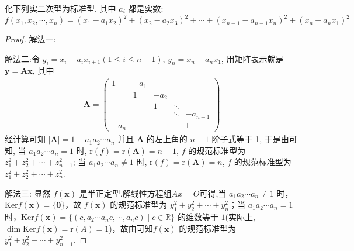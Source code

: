 \documentclass[../../main.tex]{subfiles}%
\begin{document}
\begin{example}\label{example:例8.35}
化下列实二次型为标准型, 其中 \(a_i\) 都是实数:
\[f(x_1,x_2,\cdots,x_n)=(x_1 - a_1x_2)^2+(x_2 - a_2x_3)^2+\cdots+(x_{n - 1} - a_{n - 1}x_n)^2+(x_n - a_nx_1)^2\]
\end{example}
\begin{proof}

{\color{blue}解法一:}

{\color{blue}解法二:}令 \(y_i = x_i - a_ix_{i + 1}(1\leqslant  i\leqslant  n - 1)\), \(y_n = x_n - a_nx_1\), 用矩阵表示就是 \(\boldsymbol{y} = \boldsymbol{A}\boldsymbol{x}\), 其中
\begin{align*}
\boldsymbol{A} = \begin{pmatrix}
1 & -a_1 & & & \\
& 1 & -a_2 & & \\
& & 1 & \ddots & \\
& & & \ddots & -a_{n - 1} \\
-a_n & & & & 1
\end{pmatrix}
\end{align*}
经计算可知 \(|\boldsymbol{A}| = 1 - a_1a_2\cdots a_n\) 并且 \(\boldsymbol{A}\) 的左上角的 \(n - 1\) 阶子式等于 1, 于是由可知, 当 \(a_1a_2\cdots a_n = 1\) 时, \(\mathrm{r}(f)=\mathrm{r}(\boldsymbol{A}) = n - 1\), \(f\) 的规范标准型为 \(z_1^2 + z_2^2 + \cdots + z_{n - 1}^2\); 当 \(a_1a_2\cdots a_n\neq1\) 时, \(\mathrm{r}(f)=\mathrm{r}(\boldsymbol{A}) = n\), \(f\) 的规范标准型为 \(z_1^2 + z_2^2 + \cdots + z_n^2\).

{\color{blue}解法三:}
显然 $f(\boldsymbol{x})$ 是半正定型.解线性方程组$Ax=O$可得,当 $a_1a_2\cdots a_n\neq1$ 时，$\mathrm{Ker} f(\boldsymbol{x}) = \{\boldsymbol{0}\}$，故 $f(\boldsymbol{x})$ 的规范标准型为 $y_1^2 + y_2^2+\cdots + y_n^2$；当 $a_1a_2\cdots a_n = 1$ 时，$\mathrm{Ker} f(\boldsymbol{x})=\{(c,a_2\cdots a_n c,\cdots,a_n c)\mid c\in\mathbb{R}\}$ 的维数等于 $1$(实际上,$\dim \mathrm{Ker} f(\boldsymbol{x})=\mathrm{r}(A)=1$)，故由可知$f(\boldsymbol{x})$ 的规范标准型为 $y_1^2 + y_2^2+\cdots + y_{n - 1}^2$.

\end{proof}
\end{document}
